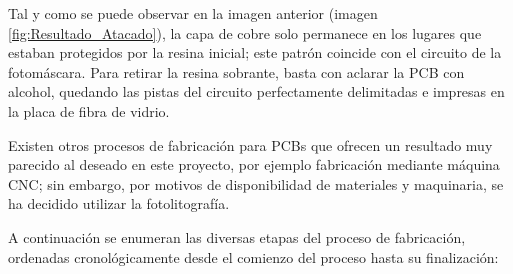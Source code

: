 \begin{itemize}
    Tal y como se puede observar en la imagen anterior (imagen \ref{fig:Resultado_Atacado}), la capa de cobre solo permanece en los lugares que estaban protegidos por la resina inicial; este patrón coincide con el circuito de la fotomáscara. Para retirar la resina sobrante, basta con aclarar la \ac{PCB} con alcohol, quedando las pistas del circuito perfectamente delimitadas e impresas en la placa de fibra de vidrio.
    
\end{itemize}

Existen otros procesos de fabricación para \ac{PCB}s que ofrecen un resultado muy parecido al deseado en este proyecto, por ejemplo fabricación mediante máquina CNC; sin embargo, por motivos de disponibilidad de materiales y maquinaria, se ha decidido utilizar la fotolitografía.

A continuación se enumeran las diversas etapas del proceso de fabricación, ordenadas cronológicamente desde el comienzo del proceso hasta su finalización:

